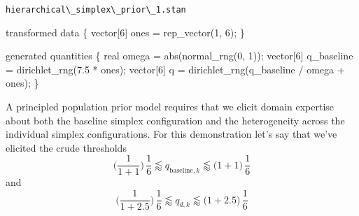 \documentclass[
  letterpaper,
  DIV=11,
  numbers=noendperiod]{scrartcl}
\newenvironment{Shaded}{\begin{snugshade}}{\end{snugshade}}
\newcommand{\AttributeTok}[1]{\textcolor[rgb]{0.40,0.45,0.13}{#1}}
\newcommand{\DataTypeTok}[1]{\textcolor[rgb]{0.68,0.00,0.00}{#1}}
\newcommand{\DecValTok}[1]{\textcolor[rgb]{0.68,0.00,0.00}{#1}}
\newcommand{\FloatTok}[1]{\textcolor[rgb]{0.68,0.00,0.00}{#1}}
\newcommand{\FunctionTok}[1]{\textcolor[rgb]{0.28,0.35,0.67}{#1}}
\newcommand{\KeywordTok}[1]{\textcolor[rgb]{0.00,0.23,0.31}{#1}}
\newcommand{\NormalTok}[1]{\textcolor[rgb]{0.00,0.23,0.31}{#1}}
\newcommand{\OtherTok}[1]{\textcolor[rgb]{0.00,0.23,0.31}{#1}}
\newcommand{\SpecialCharTok}[1]{\textcolor[rgb]{0.37,0.37,0.37}{#1}}
\newcommand{\StringTok}[1]{\textcolor[rgb]{0.13,0.47,0.30}{#1}}
\begin{document}
\begin{codelisting}

\caption{\texttt{hierarchical\textbackslash\_simplex\textbackslash\_prior\textbackslash\_1.stan}}

\begin{Shaded}
\begin{Highlighting}[]
\KeywordTok{transformed data}\NormalTok{ \{}
  \DataTypeTok{vector}\NormalTok{[}\DecValTok{6}\NormalTok{] ones = rep\_vector(}\DecValTok{1}\NormalTok{, }\DecValTok{6}\NormalTok{);}
\NormalTok{\}}

\KeywordTok{generated quantities}\NormalTok{ \{}
  \DataTypeTok{real}\NormalTok{ omega = abs(normal\_rng(}\DecValTok{0}\NormalTok{, }\DecValTok{1}\NormalTok{));}
  \DataTypeTok{vector}\NormalTok{[}\DecValTok{6}\NormalTok{] q\_baseline = dirichlet\_rng(}\FloatTok{7.5}\NormalTok{ * ones);}
  \DataTypeTok{vector}\NormalTok{[}\DecValTok{6}\NormalTok{] q = dirichlet\_rng(q\_baseline / omega + ones);}
\NormalTok{\}}
\end{Highlighting}
\end{Shaded}

\end{codelisting}

\begin{Shaded}
\end{Shaded}

A principled population prior model requires that we elicit domain
expertise about both the baseline simplex configuration and the
heterogeneity across the individual simplex configurations. For this
demonstration let's say that we've elicited the crude thresholds \[
\bigg( \frac{1}{1 + 1} \bigg) \, \frac{1}{6}
\lessapprox
q_{\mathrm{baseline}, k}
\lessapprox
\bigg( 1 + 1 \bigg) \, \frac{1}{6}
\] and \[
\bigg( \frac{1}{1 + 2.5} \bigg) \, \frac{1}{6}
\lessapprox
q_{d, k}
\lessapprox
\bigg( 1 + 2.5 \bigg) \, \frac{1}{6}
\]
\end{document}
